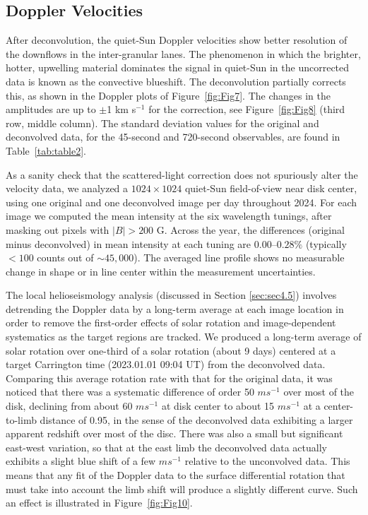\documentclass[trackchanges]{aastex62}
\begin{document}
\subsection{Doppler Velocities}\label{sec:sec4.3}

After deconvolution, the quiet-Sun Doppler velocities show better resolution of the downflows in the inter-granular lanes. The phenomenon in which the brighter, hotter, upwelling material dominates the signal in quiet-Sun in the uncorrected data is known as the convective blueshift. The deconvolution partially corrects this, as shown in the Doppler plots of Figure~\ref{fig:Fig7}. The changes in the amplitudes are up to $\pm$1 km s$^{-1}$ for the correction, see Figure~\ref{fig:Fig8} (third row, middle column). The standard deviation values for the original and deconvolved data, for the 45-second and 720-second observables, are found in Table~\ref{tab:table2}.

 As a sanity check that the scattered-light correction does not spuriously alter the velocity data, we analyzed a $1024\times1024$ quiet-Sun field-of-view near disk center, using one original and one deconvolved image per day throughout 2024. For each image we computed the mean intensity at the six wavelength tunings, after masking out pixels with $|B|>200$ G. Across the year, the differences (original minus deconvolved) in mean intensity at each tuning are $0.00$–$0.28\%$ (typically $<100$ counts out of $\sim45{,}000$). The averaged line profile shows no measurable change in shape or in line center within the measurement uncertainties.

The local helioseismology analysis (discussed in Section \ref{sec:sec4.5}) involves detrending the Doppler data by a long-term average at each image location in order to remove the first-order effects of solar rotation and image-dependent systematics as the target regions are tracked. We produced a long-term average of solar rotation over one-third of a solar rotation (about 9 days) centered at a target Carrington time (2023.01.01 09:04 UT) from the deconvolved data. Comparing this average rotation rate with that for the original data, it was noticed that there was a systematic difference of order 50 $m s^{-1}$ over most of the disk, declining from about 60 $m s^{-1}$ at disk center to about 15 $m s^{-1}$ at a center-to-limb distance of 0.95, in the sense of the deconvolved data exhibiting a larger apparent redshift over most of the disc. There was also a small but significant east-west variation, so that at the east limb the deconvolved data actually exhibits a slight blue shift of a few $m s^{-1}$ relative to the unconvolved data. This means that any fit of the Doppler data to the surface differential rotation that must take into account the limb shift will produce a slightly different curve. Such an effect is illustrated in Figure~\ref{fig:Fig10}.
\end{document}
